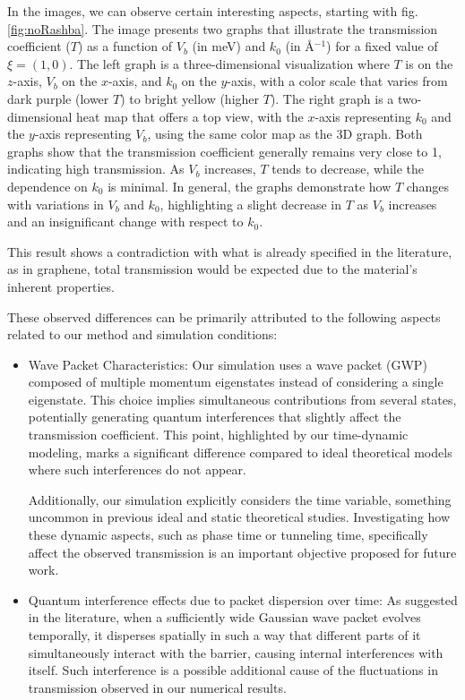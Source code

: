 In the images, we can observe certain interesting aspects, starting with fig.\ref{fig:noRashba}.
The image presents two graphs that illustrate the transmission coefficient ($T$) as a function of $V_b$ (in meV) and $k_0$ (in \AA$^{-1}$) for a fixed value of $\xi = (1, 0)$.
The left graph is a three-dimensional visualization where $T$ is on the $z$-axis, $V_b$ on the $x$-axis, and $k_0$ on the $y$-axis, with a color scale that varies from dark purple (lower $T$) to bright yellow (higher $T$).
The right graph is a two-dimensional heat map that offers a top view, with the $x$-axis representing $k_0$ and the $y$-axis representing $V_b$, using the same color map as the 3D graph.
Both graphs show that the transmission coefficient generally remains very close to 1, indicating high transmission.
As $V_b$ increases, $T$ tends to decrease, while the dependence on $k_0$ is minimal.
In general, the graphs demonstrate how $T$ changes with variations in $V_b$ and $k_0$, highlighting a slight decrease in $T$ as $V_b$ increases and an insignificant change with respect to $k_0$.

This result shows a contradiction with what is already specified in the literature, as in graphene, total transmission would be expected due to the material's inherent properties\cite{horsell2008, Young2009}.

These observed differences can be primarily attributed to the following aspects related to our method and simulation conditions:

\begin{itemize}
    \item Wave Packet Characteristics:
    Our simulation uses a wave packet (GWP) composed of multiple momentum eigenstates instead of considering a single eigenstate.
    This choice implies simultaneous contributions from several states, potentially generating quantum interferences that slightly affect the transmission coefficient\cite{Staelens2021}.
    This point, highlighted by our time-dynamic modeling, marks a significant difference compared to ideal theoretical models where such interferences do not appear.

    Additionally, our simulation explicitly considers the time variable, something uncommon in previous ideal and static theoretical studies.
    Investigating how these dynamic aspects, such as phase time or tunneling time, specifically affect the observed transmission is an important objective proposed for future work.

    \item Quantum interference effects due to packet dispersion over time:
    As suggested in the literature\cite{MolgadoMex2018}, when a sufficiently wide Gaussian wave packet evolves temporally, it disperses spatially in such a way that different parts of it simultaneously interact with the barrier, causing internal interferences with itself.
    Such interference is a possible additional cause of the fluctuations in transmission observed in our numerical results.
\end{itemize}

